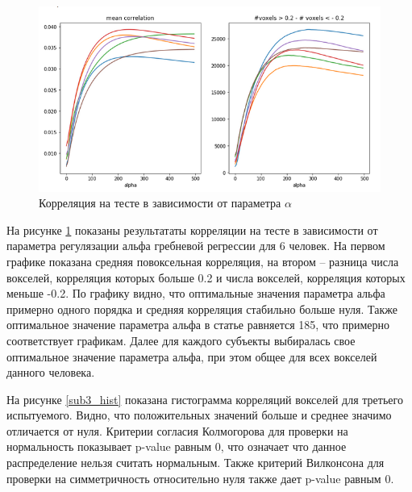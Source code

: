 \documentclass[pdftex,ptm,12pt,a4paper]{report}
\theoremstyle{definition}
\begin{document}
\begin{figure}[h]
\includegraphics[scale=0.7]{graphics/correlations2.png}
\centering
\caption{Корреляция на тесте в зависимости от параметра $\alpha$ }
\label{corr_many}
\end{figure}

На рисунке \ref{corr_many} показаны результататы корреляции на тесте в зависимости от параметра регулязации альфа гребневой регрессии для 6 человек. На первом графике показана средняя повоксельная корреляция, на втором -- разница числа вокселей, корреляция которых больше 0.2 и числа вокселей, корреляция которых меньше -0.2. По графику видно, что оптимальные значения параметра альфа примерно одного порядка и средняя корреляция стабильно больше нуля. Также оптимальное значение параметра альфа в статье \cite{huth2016natural} равняется 185, что примерно соответствует графикам. Далее для каждого субъекты выбиралась свое оптимальное значение параметра альфа, при этом общее для всех вокселей данного человека.

На рисунке \ref{sub3_hist} показана гистограмма корреляций вокселей для третьего испытуемого. Видно, что положительных значений больше и среднее значимо отличается от нуля. 
Критерии согласия Колмогорова для проверки на нормальность показывает p-value равным 0, что означает что данное распределение нельзя считать нормальным. Также критерий Вилконсона для проверки на симметричность относительно нуля также дает p-value равным 0.
\end{document}
